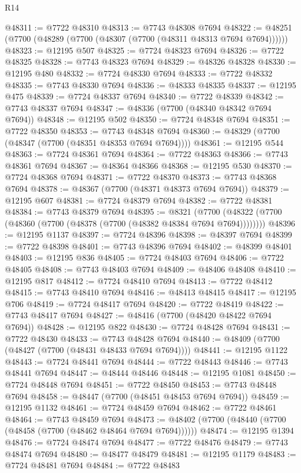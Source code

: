 \begin{lexlean}{R14}
\begin{coremodule}
@48311 := @7722 @48310
@48313 := @7743 @48308 @7694
@48322 := @48251 (@7700 (@48289 (@7700 (@48307 (@7700 (@48311 @48313 @7694 @7694))))))
@48323 := @12195 @507
@48325 := @7724 @48323 @7694
@48326 := @7722 @48325
@48328 := @7743 @48323 @7694
@48329 := @48326 @48328
@48330 := @12195 @480
@48332 := @7724 @48330 @7694
@48333 := @7722 @48332
@48335 := @7743 @48330 @7694
@48336 := @48333 @48335
@48337 := @12195 @475
@48339 := @7724 @48337 @7694
@48340 := @7722 @48339
@48342 := @7743 @48337 @7694
@48347 := @48336 (@7700 (@48340 @48342 @7694 @7694))
@48348 := @12195 @502
@48350 := @7724 @48348 @7694
@48351 := @7722 @48350
@48353 := @7743 @48348 @7694
@48360 := @48329 (@7700 (@48347 (@7700 (@48351 @48353 @7694 @7694))))
@48361 := @12195 @544
@48363 := @7724 @48361 @7694
@48364 := @7722 @48363
@48366 := @7743 @48361 @7694
@48367 := @48364 @48366
@48368 := @12195 @530
@48370 := @7724 @48368 @7694
@48371 := @7722 @48370
@48373 := @7743 @48368 @7694
@48378 := @48367 (@7700 (@48371 @48373 @7694 @7694))
@48379 := @12195 @607
@48381 := @7724 @48379 @7694
@48382 := @7722 @48381
@48384 := @7743 @48379 @7694
@48395 := @8321
    (@7700 (@48322 (@7700 (@48360 (@7700 (@48378 (@7700 (@48382 @48384 @7694 @7694))))))))
@48396 := @12195 @1137
@48397 := @7724 @48396
@48398 := @48397 @7694
@48399 := @7722 @48398
@48401 := @7743 @48396 @7694
@48402 := @48399 @48401
@48403 := @12195 @836
@48405 := @7724 @48403 @7694
@48406 := @7722 @48405
@48408 := @7743 @48403 @7694
@48409 := @48406 @48408
@48410 := @12195 @817
@48412 := @7724 @48410 @7694
@48413 := @7722 @48412
@48415 := @7743 @48410 @7694
@48416 := @48413 @48415
@48417 := @12195 @706
@48419 := @7724 @48417 @7694
@48420 := @7722 @48419
@48422 := @7743 @48417 @7694
@48427 := @48416 (@7700 (@48420 @48422 @7694 @7694))
@48428 := @12195 @822
@48430 := @7724 @48428 @7694
@48431 := @7722 @48430
@48433 := @7743 @48428 @7694
@48440 := @48409 (@7700 (@48427 (@7700 (@48431 @48433 @7694 @7694))))
@48441 := @12195 @1122
@48443 := @7724 @48441 @7694
@48444 := @7722 @48443
@48446 := @7743 @48441 @7694
@48447 := @48444 @48446
@48448 := @12195 @1081
@48450 := @7724 @48448 @7694
@48451 := @7722 @48450
@48453 := @7743 @48448 @7694
@48458 := @48447 (@7700 (@48451 @48453 @7694 @7694))
@48459 := @12195 @1132
@48461 := @7724 @48459 @7694
@48462 := @7722 @48461
@48464 := @7743 @48459 @7694
@48473 := @48402 (@7700 (@48440 (@7700 (@48458 (@7700 (@48462 @48464 @7694 @7694))))))
@48474 := @12195 @1394
@48476 := @7724 @48474 @7694
@48477 := @7722 @48476
@48479 := @7743 @48474 @7694
@48480 := @48477 @48479
@48481 := @12195 @1179
@48483 := @7724 @48481 @7694
@48484 := @7722 @48483

\end{coremodule}
\end{lexlean}
